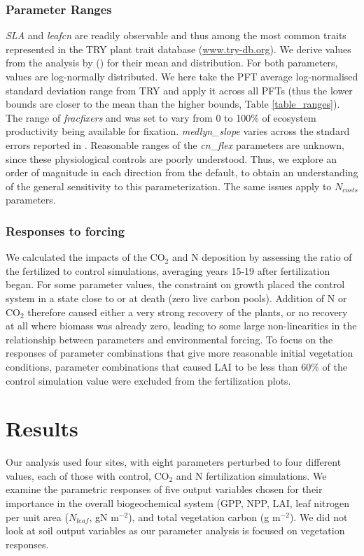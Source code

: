 \documentclass[draft,linenumbers]{agujournal}
\begin{document}
\subsubsection{Parameter Ranges}
\emph{SLA} and \emph{leafcn} are readily observable and thus among the most common traits represented in the TRY plant trait database (\url{www.try-db.org}). We derive values from the analysis by (\cite{kattge2011}) for their mean and distribution. For both parameters, values are log-normally distributed. We here take the PFT average log-normalised standard deviation range from TRY and apply it across all PFTs (thus the lower bounds are closer to the mean than the higher bounds, Table \ref{table_ranges}). The range of \emph{fracfixers} and was set to vary from 0 to 100\% of ecosystem productivity being available for fixation.  \emph{medlyn\_slope} varies across the stndard errors reported in \cite{dekauwe2015}. Reasonable ranges of the \emph{cn\_flex} parameters are unknown, since these physiological controls are poorly understood. Thus, we explore an order of magnitude in each direction from the default, to obtain an understanding of the general sensitivity to this parameterization. The same issues apply to $N_{costs}$ parameters. 

\subsubsection{Responses to forcing}
We calculated the impacts of the CO$_{2}$ and N deposition by assessing the ratio of the fertilized to control simulations, averaging years 15-19 after fertilization began. For some parameter values, the constraint on growth placed the control system in a state close to or at death (zero live carbon pools). Addition of N or CO$_{2}$ therefore caused either a very strong recovery of the plants, or no recovery at all where biomass was already zero, leading to some large non-linearities in the relationship between parameters and environmental forcing. To focus on the responses of parameter combinations that give more reasonable initial vegetation conditions, parameter combinations that caused LAI to be less than 60\% of the control simulation value were excluded from the fertilization plots.

\section{Results}
Our analysis used four sites, with eight parameters perturbed to four different values, each of those with control, CO$_{2}$ and N fertilization simulations.  We examine the parametric responses of five output variables chosen for their importance in the overall biogeochemical system (GPP, NPP, LAI, leaf nitrogen per unit area ($N_{leaf}$, gN m$^{-2}$), and total vegetation carbon (g m$^{-2}$). We did not look at soil output variables as our parameter analysis is focused on vegetation responses. 
\end{document}
